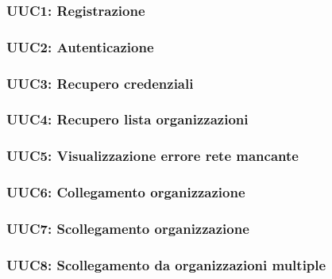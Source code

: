 \documentclass[../analisi-dei-requisiti.tex]{subfiles}
\begin{document}
\subsubsection{UUC1: Registrazione}%
\label{subs:UUC1}



\subsubsection{UUC2: Autenticazione}%
\label{subs:UUC2}



\subsubsection{UUC3: Recupero credenziali}%
\label{subs:UUC3}



\subsubsection{UUC4: Recupero lista organizzazioni}%
\label{subs:UUC4}



\subsubsection{UUC5: Visualizzazione errore rete mancante}%
\label{subs:UUC5}



\subsubsection{UUC6: Collegamento organizzazione}%
\label{subs:UUC6}



\subsubsection{UUC7: Scollegamento organizzazione}%
\label{subs:UUC7}



\subsubsection{UUC8: Scollegamento da organizzazioni multiple}%
\label{subs:UUC8}
\end{document}
